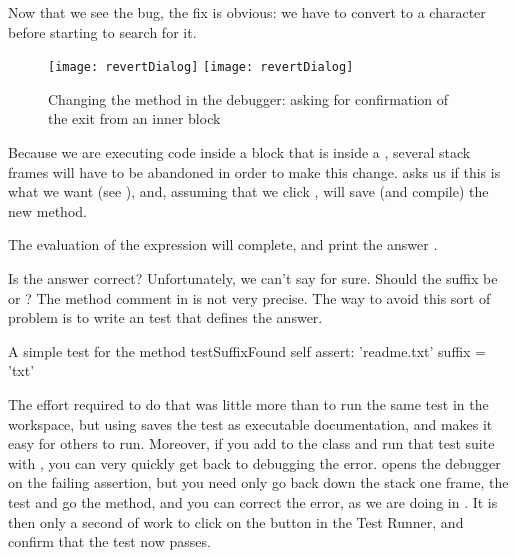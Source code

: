\documentclass[a4paper,10pt,twoside]{book}
\begin{document}
Now that we see the bug, the fix is obvious: we have to convert  to a character before starting to search for it.  

\begin{figure}[btp]
	\begin{center}
	\ifluluelse
		{\texttt{[image: revertDialog]}}
		{\texttt{[image: revertDialog]}}
	\end{center}
	\caption{Changing the  method in the debugger: asking for confirmation of the exit from an inner block}
\end{figure}


Because we are executing code inside a block that is inside a , several stack frames will have to be abandoned in order to make this change.  \pharo asks us if this is what we want (see ), and, assuming that we click , will save (and compile) the new method.


The evaluation of the expression  will complete, and print the answer .

Is the answer correct?  Unfortunately, we can't say for sure.  Should the suffix be  or ?
The method comment in  is not very precise.  
The way to avoid this sort of problem is to write an  test that defines the answer.

\begin{method}[testSuffix]{A simple test for the  method}
testSuffixFound
	self assert: 'readme.txt' suffix = 'txt'
\end{method}

The effort required to do that was little more than to run the same test in the workspace, but using \sunit saves the test as executable documentation, and makes it easy for others to run.
Moreover, if you add  to the class  and run that test suite with \sunit, you can very quickly get back to debugging the error.
\sunit opens the debugger on the failing assertion, but you need only go back down the stack one frame,  the test and go  the  method, and you can correct the error, as we are doing in .
It is then only  a second of work to click on the  button in the \sunit Test Runner, and confirm that the test now passes.
\end{document}
